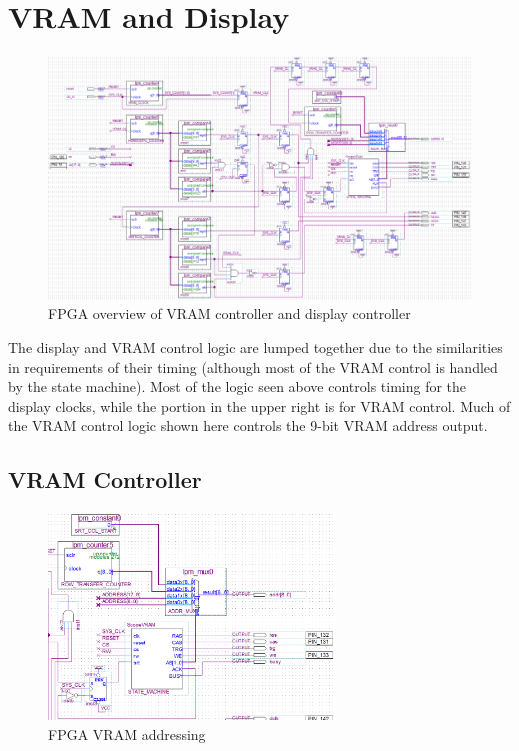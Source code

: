 \section{VRAM and Display}

\begin{figure}[ht!]
    \centering
    \includegraphics[width=6in]{fpga_logic/vram_disp_overview.png}
		\caption{FPGA overview of VRAM controller and display controller}
\end{figure}

The display and VRAM control logic are lumped together due to the similarities in requirements of their timing (although most of the VRAM control is handled by the state machine). Most of the logic seen above controls timing for the display clocks, while the portion in the upper right is for VRAM control. Much of the VRAM control logic shown here controls the 9-bit VRAM address output.

\subsection{VRAM Controller}

\begin{figure}[ht!]
    \centering
    \includegraphics[width=3in]{fpga_logic/vram_disp_addr.png}
		\caption{FPGA VRAM addressing}
\end{figure}

